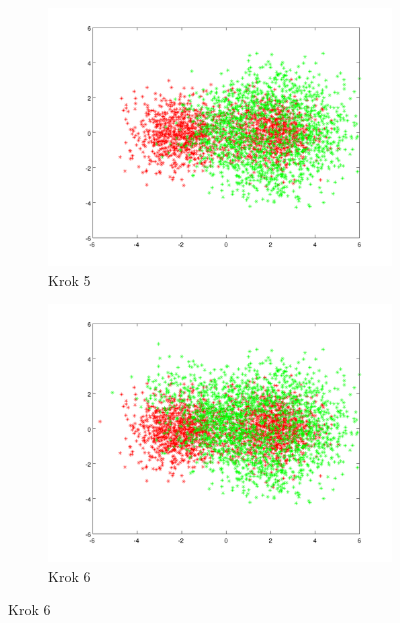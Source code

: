 \documentclass[10pt,a4paper]{article}
\begin{document}
\begin{figure}[H]
  \begin{subfigure}[b]{0.4\textwidth}
    \includegraphics[width=\textwidth]{dataGen2_step4.png}
    \caption{Krok 5}
  \end{subfigure}
  \hfill
  \begin{subfigure}[b]{0.4\textwidth}
    \includegraphics[width=\textwidth]{dataGen2_step5.png}
    \caption{Krok 6}
  \end{subfigure}
  

\end{figure}
\end{document}
